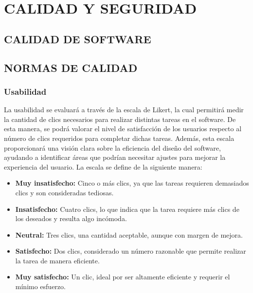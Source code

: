 \chapter{CALIDAD Y SEGURIDAD} 
\section{CALIDAD DE SOFTWARE}
\section{NORMAS DE CALIDAD}
\subsection{Usabilidad}

La usabilidad se evaluará a través de la escala de Likert, la cual permitirá medir la cantidad de clics necesarios para realizar distintas tareas en el software. De esta manera, se podrá valorar el nivel de satisfacción de los usuarios respecto al número de clics requeridos para completar dichas tareas. Además, esta escala proporcionará una visión clara sobre la eficiencia del diseño del software, ayudando a identificar áreas que podrían necesitar ajustes para mejorar la experiencia del usuario. La escala se define de la siguiente manera:

\begin{itemize}[label=$-$, left=0cm, labelsep = 0.9cm, topsep = 0pt, parsep = 0pt]
	\item \textbf{Muy insatisfecho:} Cinco o más clics, ya que las tareas requieren demasiados clics y son consideradas tediosas.		
	\item \textbf{Insatisfecho:} Cuatro clics, lo que indica que la tarea requiere más clics de los deseados y resulta algo incómoda.
	\item \textbf{Neutral:} Tres clics, una cantidad aceptable, aunque con margen de mejora.
	\item \textbf{Satisfecho:} Dos clics, considerado un número razonable que permite realizar la tarea de manera eficiente.
	\item \textbf{Muy satisfecho:} Un clic, ideal por ser altamente eficiente y requerir el mínimo esfuerzo.
\end{itemize}

